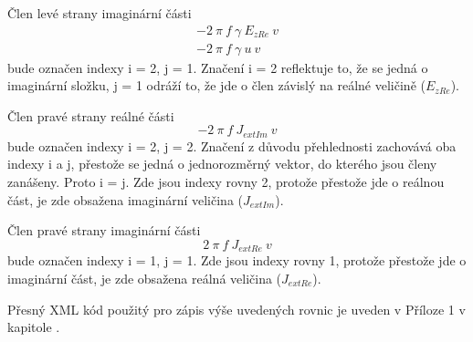 \documentclass[12pt,a4paper,oneside]{article}
\numberwithin{equation}{section} %
\numberwithin{figure}{section} %
\numberwithin{table}{section} %
\begin{document}
Člen levé strany imaginární části
\begin{subequations}
\begin{gather}
- 2 ~ \pi ~ f ~ \gamma ~ E _{zRe} ~ v
\\
- 2 ~ \pi ~ f ~ \gamma ~ u ~ v
\end{gather}
\end{subequations}
bude označen indexy i = 2, j = 1. Značení i = 2 reflektuje to, že se jedná o imaginární složku, j = 1 odráží to, že jde o člen závislý na reálné veličině ($E _{zRe}$).

Člen pravé strany reálné části
\begin{equation}
- 2 ~ \pi ~ f ~ J _{extIm} ~ v
\end{equation}
bude označen indexy i = 2, j = 2. Značení z důvodu přehlednosti zachovává oba indexy i a j, přestože se jedná o jednorozměrný vektor, do kterého jsou členy zanášeny. Proto i = j. Zde jsou indexy rovny 2, protože přestože jde o reálnou část, je zde obsažena imaginární veličina ($J _{extIm}$).

Člen pravé strany imaginární části
\begin{equation}
2 ~ \pi ~ f ~ J _{extRe} ~ v
\end{equation}
bude označen indexy i = 1, j = 1. Zde jsou indexy rovny 1, protože přestože jde o imaginární část, je zde obsažena reálná veličina ($J _{extRe}$).

Přesný XML kód použitý pro zápis výše uvedených rovnic je uveden v Příloze 1 v kapitole .
\end{document}
